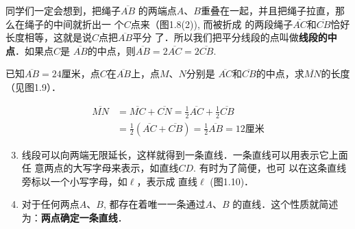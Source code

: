 同学们一定会想到，把绳子$\overline{AB}$
的两端点$A$、$B$重叠在一起，并且把绳子拉直，那么在绳子的中间就折出一
个$C$点来（图1.8(2)), 而被折成
的两段绳子$\overline{AC}$和$\overline{CB}$恰好长度相等，这就是说$C$点把$\overline{AB}$平分
了．所以我们把平分线段的点叫做\textbf{线段的中点}．如果点$C$是
$\overline{AB}$的中点，则$\overline{AB}=2\overline{AC}=2\overline{CB}$.

\begin{figure}[htp]\centering
    \begin{minipage}[t]{0.48\textwidth}
    \centering
{}
    \caption{}
    \end{minipage}
    \begin{minipage}[t]{0.48\textwidth}
    \centering
    \caption{}
    \end{minipage}
    \end{figure}



\begin{example}
	已知$\overline{AB}=24$厘米，点$C$在$\overline{AB}$上，点$M$、$N$分别是
	$\overline{AC}$和$\overline{CB}$的中点，求$\overline{MN}$的长度（见图1.9）．
\end{example}

\begin{solution}
\[\begin{split}
	\overline{MN}&=\overline{MC}+\overline{CN}=\frac{1}{2}\overline{AC}+\frac{1}{2}\overline{CB}\\
	&=\frac{1}{2}\left(\overline{AC}+\overline{CB}\right)=\frac{1}{2}\overline{AB}=12\text{厘米}
\end{split}\]
\end{solution}

\begin{enumerate}\setcounter{enumi}{2} 
	\item 线段可以向两端无限延长，这样就得到一条直线．一条直线可以用表示它上面任
	意两点的大写字母来表示，如直线$CD$. 有时为了简便，也可
	以在这条直线旁标以一个小写字母，如$\ell$，表示成
	直线$\ell $ (图1.10)．
	\item 对于任何两点$A$、$B$, 都存在着唯一一条通过$A$、$B$
	的直线．这个性质就简述为：\textbf{两点确定一条直线}．
\end{enumerate}

